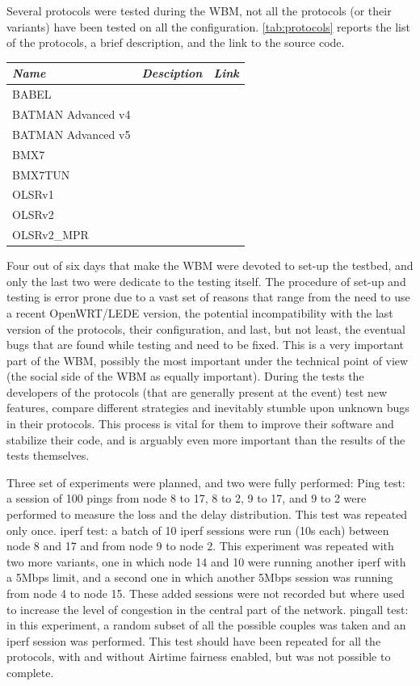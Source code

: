 \documentclass[10pt,onecolumn]{paper}
\begin{document}
Several protocols were tested during the WBM, not all the protocols (or their
variants) have been tested on all the configuration. \cref{tab:protocols}
reports the list of the protocols, a brief description, and the link to the
source code. 

\begin{table}
    \centering
    \begin{tabular}{lll}
        \emph{Name} & \emph{Desciption} & \emph{Link} \\
        \midrule
        BABEL & & \\
        BATMAN Advanced v4 & & \\
        BATMAN Advanced v5 & & \\
        BMX7  & & \\
        BMX7TUN  & & \\
        OLSRv1 & & \\
        OLSRv2 & & \\
        OLSRv2\_MPR & & \\
        \bottomrule
    \end{tabular}
\end{table}

Four out of six days that make the WBM were devoted to set-up the testbed, and
only the last two were dedicate to the testing itself. The procedure of set-up
and testing is error prone due to a vast set of reasons that range from the need
to use a recent OpenWRT/LEDE version, the potential incompatibility with the
last version of the protocols, their configuration, and last, but not least, the
eventual bugs that are found while testing and need to be fixed. This is a very
important part of the WBM, possibly the most important under the technical
point of view (the social side of the WBM as equally important). During the
tests the developers of the protocols (that are generally present at the event)
test new features, compare different strategies and inevitably stumble upon
unknown bugs in their protocols. This process is vital for them to improve their
software and stabilize their code, and is arguably even more important than the
results of the tests themselves. 

Three set of experiments were planned, and two were fully performed:
\bi
\ii Ping test: a session of 100 pings from node 8 to 17, 8 to 2, 9 to 17, and 9
to 2 were performed to measure the loss and the delay distribution. This test
was repeated only once.
\ii iperf test: a batch of 10 iperf sessions were run (10s each) between node 8
and 17 and from node 9 to node 2. This experiment was repeated with two more
variants, one in which node 14 and 10 were running another iperf with a 5Mbps
limit, and a second one in which another 5Mbps session was running from node 4
to node 15. These added sessions were not recorded but where used to increase
the level of congestion in the central part of the network.
\ii pingall test: in this experiment, a random subset of all the possible
couples was taken and an iperf session was performed. This test should have been
repeated for all the protocols, with and without Airtime fairness enabled, but
was not possible to complete.
\ei
\end{document}
